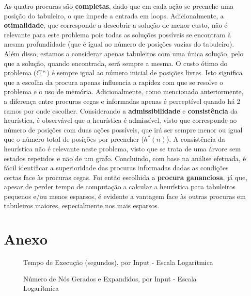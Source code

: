 \documentclass[12pt,a4paper]{article}
\begin{document}
As quatro procuras são \textbf{completas}, dado que em cada ação se preenche uma posição do tabuleiro,
o que impede a entrada em loops.
Adicionalmente, a \textbf{otimalidade}, que corresponde a descobrir a solução de menor custo,
não é relevante para este problema pois todas as soluções possíveis se encontram à mesma profundidade
(que é igual ao número de posições vazias do tabuleiro).
Além disso, estamos a considerar apenas tabuleiros com uma única solução,
pelo que a solução, quando encontrada, será sempre a mesma.
O custo ótimo do problema (\(C*\)) é sempre igual ao número inicial de posições livres.
Isto significa que a escolha da procura apenas influencia a rapidez com que se resolve o problema e o uso de memória.
Adicionalmente, como mencionado anteriormente, a diferença entre procuras cegas e informadas apenas é perceptível quando
há 2 ramos por onde escolher.
Considerando a \textbf{admissibilidade} e \textbf{consistência} da heurística, é observável que
a heurística é admissível, visto que corresponde ao número de posições com duas ações possíveis, que
irá ser sempre menor ou igual que o número total de posições por preencher (\(h^*(n)\)).
A consistência da heurística não é relevante neste problema, visto que se trata de uma árvore sem estados repetidos e não
de um grafo.
Concluindo, com base na análise efetuada, é fácil identificar a superioridade das procuras informadas dadas as
condições certas face às procuras cegas. Foi então escolhida a \textbf{procura gananciosa}, já que,
apesar de perder tempo de computação a calcular a heurística para tabuleiros pequenos e/ou menos esparsos,
é evidente a vantagem face às outras procuras em tabuleiros maiores, especialmente nos mais
esparsos.

\clearpage

\section*{Anexo}

\begin{figure}[h]%
  \centering
  
  \caption{Tempo de Execução (segundos), por Input - Escala Logarítmica}
\end{figure}

\begin{figure}[h]%
  \centering
  \qquad
  \caption{Número de Nós Gerados e Expandidos, por Input - Escala Logarítmica}%
\end{figure}
\end{document}

